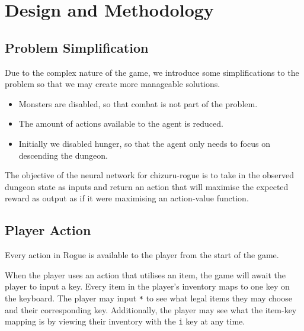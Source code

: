 \documentclass[12pt,a4paper]{article}
\begin{document}
    \section{Design and Methodology}\label{sec:design-and-methodology}
    \subsection{Problem Simplification}\label{subsec:problem-simplification}
    Due to the complex nature of the game, we introduce some simplifications to the problem so that
    we may create more manageable solutions.

    \begin{itemize}
        \item Monsters are disabled, so that combat is not part of the problem.
        \item The amount of actions available to the agent is reduced.
        \item Initially we disabled hunger, so that the agent only needs to focus on descending the dungeon.
    \end{itemize}

    The objective of the neural network for chizuru-rogue is to take in the observed dungeon state as inputs and return an action that will maximise the expected reward as output as if it were maximising an action-value function.

    \subsection{Player Action}\label{subsec:action}
    Every action in Rogue is available to the player from the start of the game.

    When the player uses an action that utilises an item, the game will await the player to input a key.
    Every item in the player's inventory maps to one key on the keyboard.
    The player may input \texttt{*} to see what legal items they may choose and their corresponding key.
    Additionally, the player may see what the item-key mapping is by viewing their inventory with the \texttt{i} key at any time.
\end{document}
